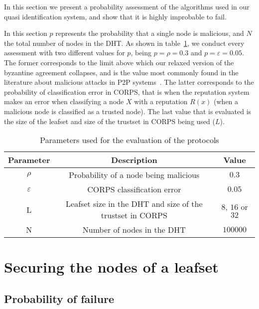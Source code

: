 In this section we present a probability assessment of
the algorithms used in our quasi identification system, and show that it is highly
improbable to fail.

In this section $p$ represents the probability that a single node is
malicious, and $N$ the total number of nodes in the DHT.
As shown in table~\ref{tab:variables_used}, we conduct every
assessment with two different values for $p$, being $p = \rho = 0.3$ and $p = \varepsilon =  0.05$.
The former corresponds to the limit above which our relaxed version of the
byzantine agreement collapses, and is the value most
commonly found in the literature about malicious attacks in P2P
systems~\cite{p2p_certification}. The latter corresponds to the probability of
classification error in CORPS, that is when the reputation system makes an error when classifying a
node $X$ with a reputation $R(x)$ (when a malicious node is classified as a trusted
node). The last  value that is evaluated is the
size of the leafset and size of the trustset in CORPS being used ($L$).


  \begin{table}
    \centering
    \footnotesize
    \begin{tabular}{|ccc|}
      \hline
      \textbf{Parameter} & \textbf{Description} & \textbf{Value} \\
      \hline
      $\rho$ &  Probability of a node being malicious  & $0.3$  \\
      $\varepsilon$& CORPS classification error   & $0.05$ \\
      L &  Leafset size in the DHT and size of the trustset in CORPS  & $8$, $16$ or $32$  \\
      N &  Number of nodes in the DHT & $100000$  \\
      \hline
    \end{tabular}
    \caption{Parameters used for the evaluation of the protocols}
    \label{tab:variables_used}
  \end{table}




\section{Securing the nodes of a leafset}
\label{sec:eval_leafset}
  
  \subsection{Probability of failure}
  
